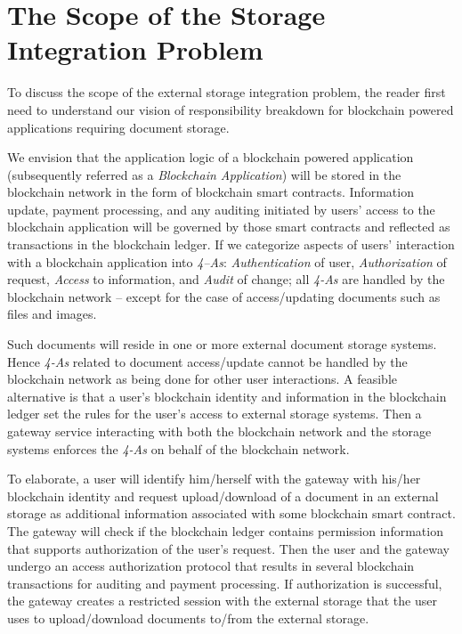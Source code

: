 \section{The Scope of the Storage Integration Problem}
\label{s-scope}
To discuss the scope of the external storage integration problem, the reader first need to understand our vision of responsibility breakdown for blockchain powered applications requiring document storage.
 
We envision that the application logic of a blockchain powered application (subsequently referred as a \textit{Blockchain Application}) will be stored in the blockchain network in the form of blockchain smart contracts. Information update, payment processing, and any auditing initiated by users' access to the blockchain application will be governed by those smart contracts and reflected as transactions in the blockchain ledger. If we categorize aspects of users' interaction with a blockchain application into \textit{4--As}: \textit{Authentication} of user, \textit{Authorization} of request, \textit{Access} to information, and \textit{Audit} of change; all \textit{4-As} are handled by the blockchain network -- except for the case of access/updating documents such as files and images.

Such documents will reside in one or more external document storage systems. Hence \textit{4-As} related to document access/update cannot be handled by the blockchain network as being done for other user interactions. A feasible alternative is that a user's blockchain identity and information in the blockchain ledger set the rules for the user's access to external storage systems. Then a gateway service interacting with both the blockchain network and the storage systems enforces the \textit{4-As} on behalf of the blockchain network.

To elaborate, a user will identify him/herself with the gateway with his/her blockchain identity and request upload/download of a document in an external storage as additional information associated with some blockchain smart contract. The gateway will check if the blockchain ledger contains permission information that supports authorization of the user's request. Then the user and the gateway undergo an access authorization protocol that results in several blockchain transactions for auditing and payment processing. If authorization is successful, the gateway creates a restricted session with the external storage that the user uses to upload/download documents to/from the external storage.

